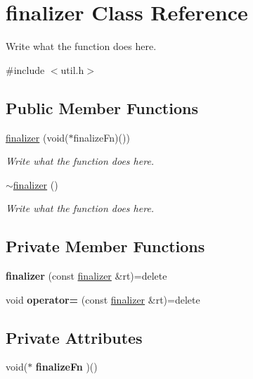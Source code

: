 \hypertarget{classfinalizer}{\section{finalizer Class Reference}
\label{classfinalizer}
}


Write what the function does here.  




{\ttfamily \#include $<$util.\+h$>$}

\subsection*{Public Member Functions}
\begin{DoxyCompactItemize}
\item 
\hyperlink{classfinalizer_abfb1a53ac8097489f7f832fab70ed438}{finalizer} (void($\ast$finalize\+Fn)())
\begin{DoxyCompactList}\small\item\em Write what the function does here. \end{DoxyCompactList}\item 
\hyperlink{classfinalizer_a5dd96a3bece0e0dc19686da3eeafbd0d}{$\sim$finalizer} ()
\begin{DoxyCompactList}\small\item\em Write what the function does here. \end{DoxyCompactList}\end{DoxyCompactItemize}
\subsection*{Private Member Functions}
\begin{DoxyCompactItemize}
\item 
\hypertarget{classfinalizer_ae13d210c53c985301d67b6744f6455de}{{\bfseries finalizer} (const \hyperlink{classfinalizer}{finalizer} \&rt)=delete}\label{classfinalizer_ae13d210c53c985301d67b6744f6455de}

\item 
\hypertarget{classfinalizer_aea0825760a746dad9f22299960bc83c8}{void {\bfseries operator=} (const \hyperlink{classfinalizer}{finalizer} \&rt)=delete}\label{classfinalizer_aea0825760a746dad9f22299960bc83c8}

\end{DoxyCompactItemize}
\subsection*{Private Attributes}
\begin{DoxyCompactItemize}
\item 
\hypertarget{classfinalizer_ac9a4efb8dc93d75de3fb6561ebb59d0a}{void($\ast$ {\bfseries finalize\+Fn} )()}\label{classfinalizer_ac9a4efb8dc93d75de3fb6561ebb59d0a}

\end{DoxyCompactItemize}


